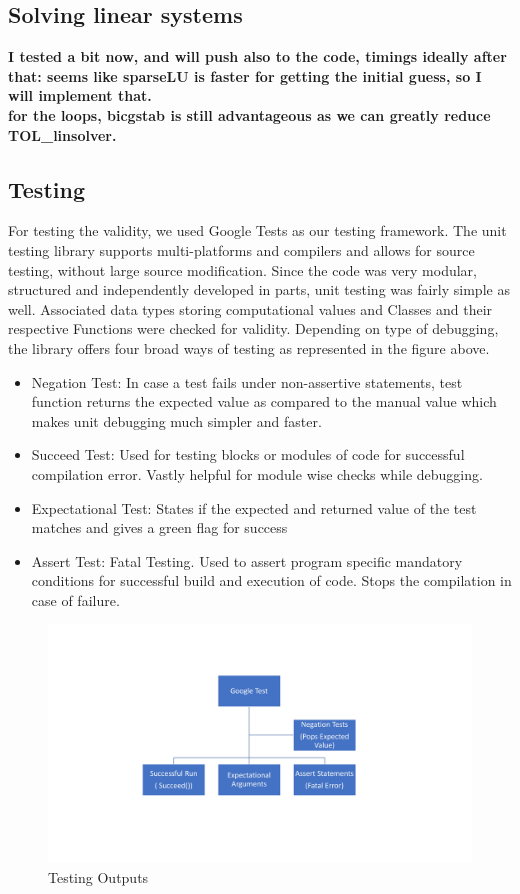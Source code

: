 \documentclass[11pt]{scrartcl}
\begin{document}
\subsection{Solving linear systems}

	\textbf{I tested a bit now, and will push also to the code, timings ideally after that:
	seems like sparseLU is faster for getting the initial guess, so I will implement that.\\
	for the loops, bicgstab is still advantageous as we can greatly reduce TOL\_linsolver.}
\normalfont
\subsection{Testing}
For testing the validity, we used Google Tests as our testing framework. The unit testing library supports multi-platforms and compilers and allows for source testing, without large source modification. Since the code was very modular, structured and independently developed in parts, unit testing was fairly simple as well. Associated data types storing computational values and Classes and their respective Functions were checked for validity. 
Depending on type of debugging, the library offers four broad ways of testing as represented in the figure above.

\begin{itemize}
  \item Negation Test: In case a test fails under non-assertive statements, test function returns the expected value as compared to the manual value which makes unit debugging much simpler and faster.
  \item Succeed Test: Used for testing blocks or modules of code for successful compilation error. Vastly helpful for module wise checks while debugging.
 \item Expectational Test: States if the expected and returned value of the test matches and gives a green flag for success
 \item Assert Test: Fatal Testing. Used to assert program specific mandatory conditions for successful build and execution of code. Stops the compilation in case of failure.
\end{itemize}

\begin{figure}
	\centering
	\includegraphics[width=1\textwidth]{figs/Test.pdf}
	\caption{Testing Outputs}\label{fig:Google Test}
\end{figure}
\end{document}

